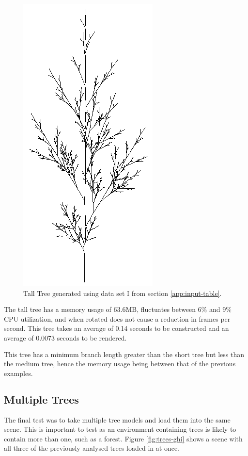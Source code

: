 \documentclass[final]{cmpreport}
\begin{document}
\begin{figure}[ht]
    \includegraphics[scale=0.7]{tree-i.PNG} 
    \centering
    \captionsetup{justification=centering}
    \caption{Tall Tree generated using data set I from section \ref{app:input-table}.}
    \label{fig:tree-i}
\end{figure}

The tall tree has a memory usage of 63.6MB, fluctuates between 6\% and 9\% 
CPU utilization, and when rotated does not cause a reduction in frames per second. This tree takes 
an average of 0.14 seconds to be constructed and an average of 0.0073 seconds to be rendered.

This tree has a minimum branch length greater than the short tree but less than the medium tree,
hence the memory usage being between that of the previous examples.

\pagebreak
\subsection{Multiple Trees}
The final test was to take multiple tree models and load them into the same scene. This is 
important to test as an environment containing trees is likely to contain more than one, such as 
a forest. Figure \ref{fig:trees-ghi} shows a scene with all three of the previously analysed 
trees loaded in at once. 
\end{document}
